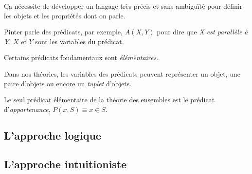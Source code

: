 \documentclass[fleqn,a4paper,nobib]{tufte-handout}
\begin{document}
Ça nécessite de développer un langage très précis et sans
ambiguïté pour définir les objets et les propriétés dont on parle.

Pinter parle des prédicats, par exemple, $A(X, Y)$ pour dire
que \textit{X est parallèle à Y}. $X$ et $Y$ sont les
variables du prédicat. 

Certains prédicats fondamentaux sont \textit{élémentaires}.

Dans nos théories, les variables des prédicats peuvent représenter
un objet, une paire d'objets ou encore un \textit{tuplet}
 d'objets.

Le seul prédicat élémentaire de la théorie des ensembles
est le prédicat d'\textit{appartenance}, $P(x, S) \equiv x \in S$.

\subsection{L'approche logique}

\subsection{L'approche intuitioniste}
\end{document}
